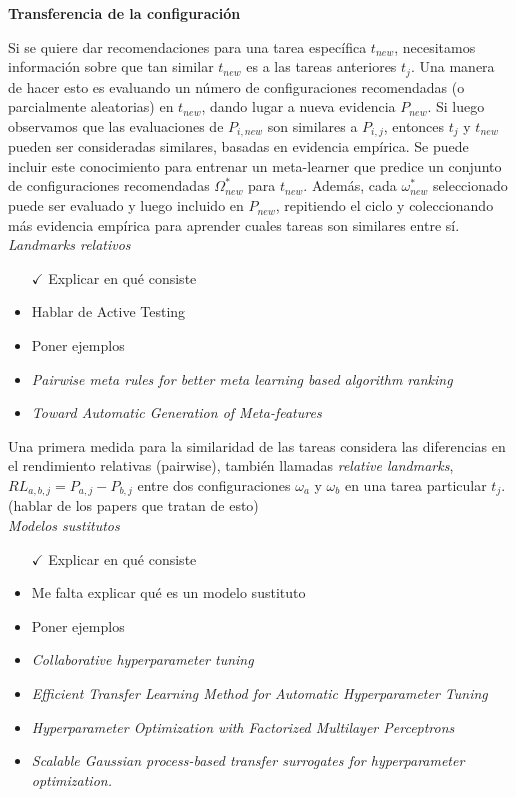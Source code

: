 \textbf{Transferencia de la configuración}

Si se quiere dar recomendaciones para una tarea específica $t_{new}$, necesitamos información sobre que tan similar $t_{new}$ es a las tareas anteriores $t_j$. Una manera de hacer esto es evaluando un número de configuraciones recomendadas (o parcialmente aleatorias) en $t_{new}$, dando lugar a nueva evidencia $P_{new}$. Si luego observamos que las evaluaciones de $P_{i,new}$ son similares a $P_{i,j}$, entonces $t_j$ y $t_{new}$ pueden ser consideradas similares, basadas en evidencia empírica. Se puede incluir este conocimiento para entrenar un meta-learner que predice un conjunto de configuraciones recomendadas $\Omega_{new}^*$ para $t_{new}$. Además, cada $\omega^*_{new}$ seleccionado puede ser evaluado y luego incluido en $P_{new}$, repitiendo el ciclo y coleccionando más evidencia empírica para aprender cuales tareas son similares entre sí.\\

\textit{Landmarks relativos}

\begin{itemize}
	\item[$\checkmark$] Explicar en qué consiste
	\item Hablar de Active Testing
	\item Poner ejemplos
	\item \textit{Pairwise meta rules for better meta learning based algorithm ranking}
	\item \textit{Toward Automatic Generation of Meta-features}
\end{itemize}

Una primera medida para la similaridad de las tareas considera las diferencias en el rendimiento relativas (pairwise), también llamadas \textit{relative landmarks}, $RL_{a,b,j} = P_{a,j} - P_{b,j}$ entre dos configuraciones $\omega_a$ y $\omega_b$ en una tarea particular $t_j$. (hablar de los papers que tratan de esto) \\

\textit{Modelos sustitutos}

\begin{itemize}
	\item[$\checkmark$] Explicar en qué consiste
	\item Me falta explicar qué es un modelo sustituto
	\item Poner ejemplos
	\item \textit{Collaborative hyperparameter tuning}
	\item \textit{Efficient Transfer Learning Method for Automatic Hyperparameter Tuning}
	\item \textit{Hyperparameter Optimization with Factorized Multilayer Perceptrons}
	\item \textit{Scalable Gaussian process-based transfer surrogates for hyperparameter optimization.}
\end{itemize}

